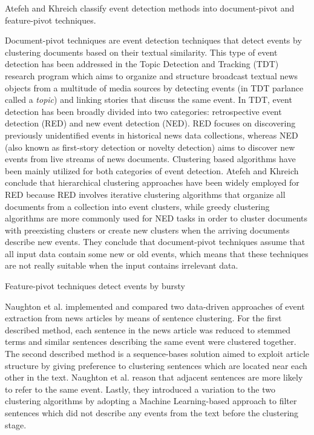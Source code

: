 \documentclass[a4paper, 10pt, conference]{ieeeconf}      %
\begin{document}
Atefeh and Khreich\cite{atefeh2015survey} classify event detection methods into document-pivot and feature-pivot techniques. 

Document-pivot techniques are event detection techniques that detect events by clustering documents based on their textual similarity. This type of event detection has been addressed in the Topic Detection and Tracking (TDT) research program which aims to organize and structure broadcast textual news objects from a multitude of media sources by detecting events (in TDT parlance called a \textit{topic}) and linking stories that discuss the same event\cite{allan1998topic}. In TDT, event detection has been broadly divided into two categories: retrospective event detection (RED)\cite{yang1998studyofretrospective} and new event detection (NED)\cite{allan1998line}. RED focuses on discovering previously unidentified events in historical news data collections, whereas NED (also known as first-story detection or novelty detection) aims to discover new events from live streams of news documents. Clustering based algorithms have been mainly utilized for both categories of event detection\cite{atefeh2015survey}. Atefeh and Khreich conclude that hierarchical clustering approaches have been widely employed for RED because RED involves iterative clustering algorithms that organize all documents from a collection into event clusters, while greedy clustering algorithms are more commonly used for NED tasks in order to cluster documents with preexisting clusters or create new clusters when the arriving documents describe new events. They conclude that document-pivot techniques assume that all input data contain some new or old events, which means that these techniques are not really suitable when the input contains irrelevant data.

Feature-pivot techniques detect events by bursty   

Naughton et al.\cite{naughton2006event} implemented and compared two data-driven approaches of event extraction from news articles by means of sentence clustering. For the first described method, each sentence in the news article was reduced to stemmed terms and similar sentences describing the same event were clustered together. The second described method is a sequence-bases solution aimed to exploit article structure by giving preference to clustering sentences which are located near each other in the text. Naughton et al. reason that adjacent sentences are more likely to refer to the same event. Lastly, they introduced a variation to the two clustering algorithms by adopting a Machine Learning-based approach to filter sentences which did not describe any events from the text before the clustering stage.
\end{document}
